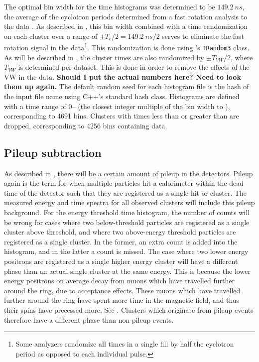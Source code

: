 The optimal bin width for the time histograms was determined to be $\SI{149.2}{ns}$, the average of the cyclotron periods determined from a fast rotation analysis to the data \cite{fastrotationsomething}. As described in , this bin width combined with a time randomization on each cluster over a range of $\pm T_{c}/2 = \SI{149.2}{ns} / 2$ serves to eliminate the fast rotation signal in the data\footnote{Some analyzers randomize all times in a single fill by half the cyclotron period as opposed to each individual pulse.}. This randomization is done using \ROOT's \texttt{TRandom3} class. As will be described in , the cluster times are also randomized by $\pm T_{VW}/2$, where $T_{VW}$ is determined per dataset. This is done in order to remove the effects of the VW in the data. \textbf{Should I put the actual numbers here? Need to look them up again.} The default random seed for each histogram \ROOT file is the hash of the input file name using C++'s standard hash class. Histograms are defined with a time range of 0-- (the closest integer multiple of the bin width to ), corresponding to 4691 bins. Clusters with times less than  or greater than  are dropped, corresponding to 4256 bins containing data.



\subsection{Pileup subtraction}
\label{sub:pileupsubtraction}


As described in , there will be a certain amount of pileup in the detectors. Pileup again is the term for when multiple particles hit a calorimeter within the dead time of the detector such that they are registered as a single hit or cluster. The measured energy and time spectra for all observed clusters will include this pileup background. For the energy threshold time histogram, the number of counts will be wrong for cases where two below-threshold particles are registered as a single cluster above threshold, and where two above-energy threshold particles are registered as a single cluster. In the former, an extra count is added into the histogram, and in the latter a count is missed. The case where two lower energy positrons are registered as a single higher energy cluster will have a different \gmtwo phase than an actual single cluster at the same energy. This is because the lower energy positrons on average decay from muons which have travelled further around the ring, due to acceptance effects. These muons which have travelled further around the ring have spent more time in the magnetic field, and thus their spins have precessed more. See . Clusters which originate from pileup events therefore have a different \gmtwo phase than non-pileup events. 


